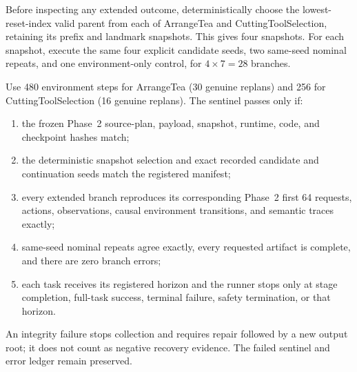 Before inspecting any extended outcome, deterministically choose the lowest-reset-index valid parent from each of ArrangeTea and CuttingToolSelection, retaining its prefix and landmark snapshots. This gives four snapshots. For each snapshot, execute the same four explicit candidate seeds, two same-seed nominal repeats, and one environment-only control, for $4\times7=28$ branches.

Use 480 environment steps for ArrangeTea (30 genuine replans) and 256 for CuttingToolSelection (16 genuine replans). The sentinel passes only if:
\begin{enumerate}
  \item the frozen Phase~2 source-plan, payload, snapshot, runtime, code, and checkpoint hashes match;
  \item the deterministic snapshot selection and exact recorded candidate and continuation seeds match the registered manifest;
  \item every extended branch reproduces its corresponding Phase~2 first 64 requests, actions, observations, causal environment transitions, and semantic traces exactly;
  \item same-seed nominal repeats agree exactly, every requested artifact is complete, and there are zero branch errors;
  \item each task receives its registered horizon and the runner stops only at stage completion, full-task success, terminal failure, safety termination, or that horizon.
\end{enumerate}


An integrity failure stops collection and requires repair followed by a new output root; it does not count as negative recovery evidence. The failed sentinel and error ledger remain preserved.


